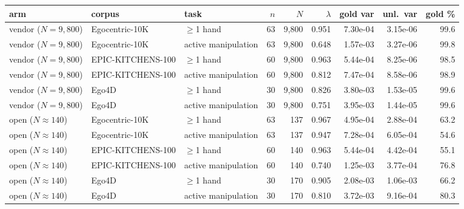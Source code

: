 \begin{tabular}{@{}lllrrrrrr@{}}
\toprule
arm & corpus & task & $n$ & $N$ & $\lambda$ & gold var & unl.\ var & gold \% \\
\midrule
vendor ($N=9{,}800$) & Egocentric-10K & $\geq$1 hand & 63 & 9,800 & 0.951 & 7.30e-04 & 3.15e-06 & 99.6 \\
vendor ($N=9{,}800$) & Egocentric-10K & active manipulation & 63 & 9,800 & 0.648 & 1.57e-03 & 3.27e-06 & 99.8 \\
vendor ($N=9{,}800$) & EPIC-KITCHENS-100 & $\geq$1 hand & 60 & 9,800 & 0.963 & 5.44e-04 & 8.25e-06 & 98.5 \\
vendor ($N=9{,}800$) & EPIC-KITCHENS-100 & active manipulation & 60 & 9,800 & 0.812 & 7.47e-04 & 8.58e-06 & 98.9 \\
vendor ($N=9{,}800$) & Ego4D & $\geq$1 hand & 30 & 9,800 & 0.826 & 3.80e-03 & 1.53e-05 & 99.6 \\
vendor ($N=9{,}800$) & Ego4D & active manipulation & 30 & 9,800 & 0.751 & 3.95e-03 & 1.44e-05 & 99.6 \\
\midrule
open ($N\approx 140$) & Egocentric-10K & $\geq$1 hand & 63 & 137 & 0.967 & 4.95e-04 & 2.88e-04 & 63.2 \\
open ($N\approx 140$) & Egocentric-10K & active manipulation & 63 & 137 & 0.947 & 7.28e-04 & 6.05e-04 & 54.6 \\
open ($N\approx 140$) & EPIC-KITCHENS-100 & $\geq$1 hand & 60 & 140 & 0.963 & 5.44e-04 & 4.42e-04 & 55.1 \\
open ($N\approx 140$) & EPIC-KITCHENS-100 & active manipulation & 60 & 140 & 0.740 & 1.25e-03 & 3.77e-04 & 76.8 \\
open ($N\approx 140$) & Ego4D & $\geq$1 hand & 30 & 170 & 0.905 & 2.08e-03 & 1.06e-03 & 66.2 \\
open ($N\approx 140$) & Ego4D & active manipulation & 30 & 170 & 0.810 & 3.72e-03 & 9.16e-04 & 80.3 \\
\bottomrule
\end{tabular}
